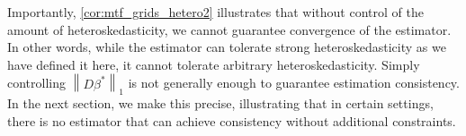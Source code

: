 \documentclass[ejs,noshowframe]{imsart}
\theoremstyle{plain}
\theoremstyle{definition}
\newcommand{\norm}[1]{\left\lVert #1 \right\rVert}
\newcommand{\one}{\mathbf{1}}
\renewcommand{\hat}{\widehat}
\begin{document}
Importantly, \autoref{cor:mtf_grids_hetero2} illustrates that without control of
the amount of heteroskedasticity, we cannot guarantee convergence of the
estimator. In other words, while the estimator can tolerate strong
heteroskedasticity as we have defined it here, it cannot tolerate arbitrary
heteroskedasticity. Simply controlling $\norm{D\beta^*}_1$ is not generally
enough to guarantee estimation consistency. In the next section, we make this
precise, illustrating that in certain settings,  there is no estimator that can
achieve consistency 
without additional constraints.




\end{document}
